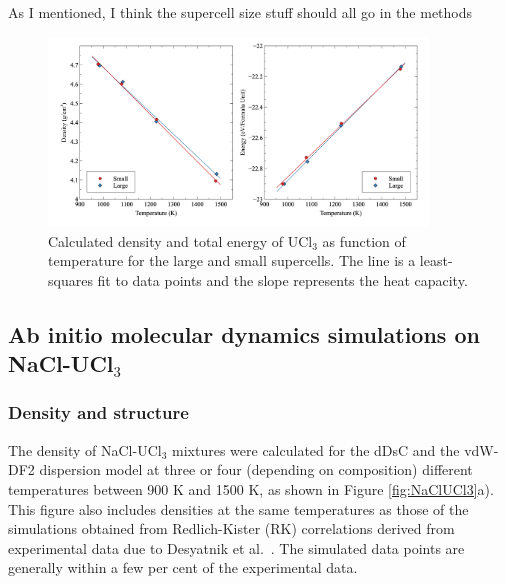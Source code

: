 \documentclass[preprint,3p,10pt,onecolumn,number,sort&compress]{elsarticle}
\begin{document}
{\color{red} As I mentioned, I think the supercell size stuff should all go in the methods}

\begin{figure}[htb]
\centering
\includegraphics[width=0.9\textwidth]{fig6.jpg}
\caption{Calculated density and total energy of UCl$_3$ as function of temperature for the large and small supercells. The line is a least-squares fit to data points and the slope represents the heat capacity.} 
\label{fig:UCl3size}
\end{figure}

\FloatBarrier

\subsection{Ab initio molecular dynamics simulations on NaCl-UCl$_3$}
\subsubsection{Density and structure}
The density of NaCl-UCl$_3$ mixtures were calculated for the dDsC and the vdW-DF2 dispersion model at three or four (depending on composition) different temperatures between 900 K and 1500 K, as shown in Figure \ref{fig:NaClUCl3}a). This figure also includes densities at the same temperatures as those of the simulations obtained from Redlich-Kister (RK) correlations \cite{agca2022} derived from experimental data due to Desyatnik et al.~\cite{Desyatnik}. The simulated data points are generally within a few per cent of the experimental data. 
\end{document}
